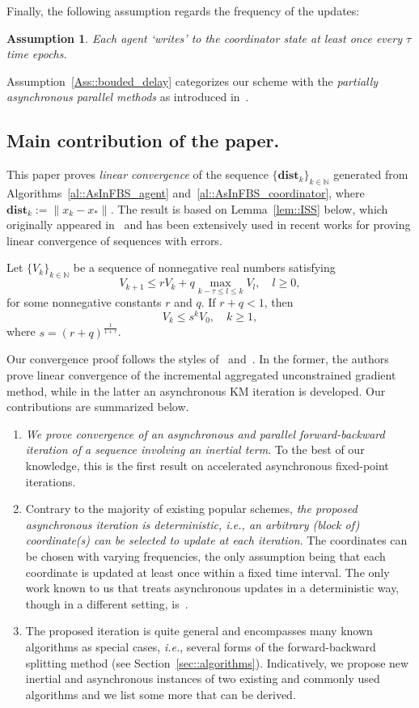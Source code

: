 \documentclass[envcountsect]{svjour3}
\newcommand{\ie}{{\it i.e.}}
\newcommand{\N}{{\mathbb{N} }}
\newcommand{\dist}{{\mathbf{dist} }}
\newtheorem{assumption}{Assumption}
\begin{document}
Finally, the following assumption regards the frequency of the updates:
\begin{assumption}{\label{Ass::bouded_delay}}
Each agent `writes' to the coordinator state at least once every $\tau$ time epochs.
\end{assumption}
Assumption~\ref{Ass::bouded_delay} categorizes our scheme with the \emph{partially asynchronous parallel methods} as introduced in~\cite[Chapter~7]{bertsekas1989parallel}.


\subsection{Main contribution of the paper. }\label{sec::contribution} %
This paper proves \emph{linear convergence} of the sequence $\{\dist_k\}_{k\in\mathbb{N}}$ generated from Algorithms~\ref{al::AsInFBS_agent} and~\ref{al::AsInFBS_coordinator}, where $\dist_k:=\|x_k-x_\ast\|$. The result is based on Lemma~\ref{lem::ISS} below, which originally appeared in~\cite{lyapunov_approx} and has been extensively used in recent works for proving linear convergence of sequences with errors.
\begin{lemma}{\label{lem::ISS}}
 Let $\{V_k\}_{k\in\N}$ be a sequence of nonnegative real numbers satisfying
 \[
  V_{k+1} \leq rV_k+q\underset{k-\tau\leq l\leq k}{\max}V_l, \quad l\geq 0,
 \]
 for some nonnegative constants $r$ and $q$. If $r+q<1$, then
 \[
  V_k\leq s^kV_0, \quad k\geq 1,
 \]
 where $s=(r+q)^\frac{1}{1+\tau}$.
\end{lemma}
Our convergence proof follows the styles of~\cite{gurbuzbalaban2015convergence} and~\cite{peng2015arock}. In the former, the authors prove linear convergence of the incremental aggregated unconstrained gradient method, while in the latter an asynchronous KM iteration is developed. Our contributions are summarized below.
\begin{enumerate}
 \item \emph{We prove convergence of an asynchronous and parallel forward-backward iteration of a sequence involving an inertial term}. To the best of our knowledge, this is the first result on accelerated asynchronous fixed-point iterations.
 \item Contrary to the majority of existing popular schemes, \emph{the proposed asynchronous iteration is deterministic, \ie, an arbitrary (block of) coordinate(s) can be selected to update at each iteration}. The coordinates can be chosen with varying frequencies, the only assumption being that each coordinate is updated at least once within a fixed time interval. The only work known to us that treats asynchronous updates in a deterministic way, though in a different setting, is~\cite{async_block}.
 \item The proposed iteration is quite general and encompasses many known algorithms as special cases, \ie, several forms of the forward-backward splitting method (see Section~\ref{sec::algorithms}). Indicatively, we propose new inertial and asynchronous instances of two existing and commonly used algorithms and we list some more that can be derived.
\end{enumerate}
\end{document}
